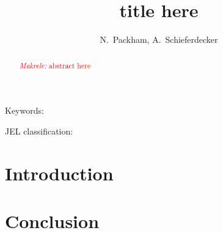 \documentclass[11pt,a4paper]{article}
\providecommand{\natp}[1]{\textcolor{red}{\textit{Makrele: }#1}}
\theoremstyle{plain}
\theoremstyle{definition} %
\begin{document}
\title{\Large\bf title here} %
\author{N.\ Packham, A.\ Schieferdecker\footnotemark} %
\maketitle %

\begin{abstract}
  \natp{abstract here}
\end{abstract}

\noindent Keywords: \medskip

\noindent JEL classification: 


\section{Introduction}
\label{sec:introduction}



\section{Conclusion}
\label{sec:conclusion}

\clearpage

\appendix

\end{document}

